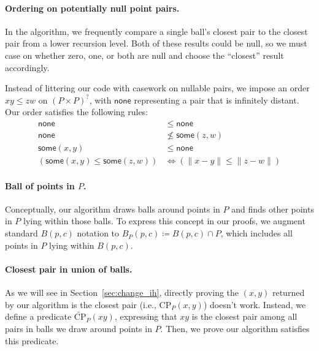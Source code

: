 \documentclass{article}
\begin{document}
\paragraph{Ordering on potentially null point pairs.}
In the algorithm, we frequently compare a single ball's closest pair to the closest pair from a lower recursion level.
Both of these results could be null, so we must case on whether zero, one, or both are null and choose the ``closest'' result accordingly.

Instead of littering our code with casework on nullable pairs, we impose an order $x\!y \leq z\!w$ on $(P \times P)^?$, with $\mathsf{none}$ representing a pair that is infinitely distant.
Our order satisfies the following rules:
\begin{align*}
  \mathsf{none} & \leq \mathsf{none} \\
  \mathsf{none} & \not\leq \mathsf{some}(z, w) \\
  \mathsf{some}(x, y) & \leq \mathsf{none} \\
  (\mathsf{some}(x, y) \leq \mathsf{some}(z, w)) &\Leftrightarrow (\|x - y\| \leq \|z - w\|)
\end{align*}

\paragraph{Ball of points in $P$.}
Conceptually, our algorithm draws balls around points in $P$ and finds other points in $P$ lying within those balls.
To express this concept in our proofs, we augment standard $B(p, c)$ notation to $B_{P}(p, c) \coloneqq B(p, c) \cap P$, which includes all points in $P$ lying within $B(p, c)$.

\paragraph{Closest pair in union of balls.}
As we will see in Section~\ref{sec:change_ih}, directly proving the $(x, y)$ returned by our algorithm is the closest pair (i.e., $\text{CP}_P(x, y)$) doesn't work.
Instead, we define a predicate $\widetilde{\text{CP}}_P(x\!y)$, expressing that $x\!y$ is the closest pair among all pairs in balls we draw around points in $P$.
Then, we prove our algorithm satisfies this predicate.
\end{document}
